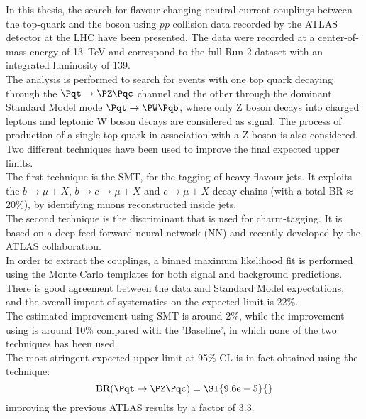 In this thesis, the search for flavour-changing neutral-current 
couplings between the top-quark and the \PZ boson using $pp$ collision 
data recorded by the ATLAS detector at the LHC have been presented.
The data were recorded at a center-of-mass energy of \SI{13}{\TeV} and correspond to the full Run-2 dataset with an integrated luminosity of \SI{139}{\ifb}. \\
The analysis is performed to search for \ttbar events with one top quark decaying through the $\Pqt\rightarrow\PZ\Pqc$ channel and the other through the dominant Standard Model mode $\Pqt\rightarrow\PW\Pqb$, where only Z boson decays into charged leptons and leptonic W boson decays are considered as signal.
The process of production of a single top-quark in association with a Z boson is also considered.\\
Two different techniques have been used to improve the final expected upper limits.
\vspace{\baselineskip}
\\The first technique is the SMT, for the tagging of heavy-flavour jets. It exploits the $b \rightarrow \mu + X$, $b \rightarrow c \rightarrow \mu + X$ and $c \rightarrow \mu + X$ decay chains (with a total BR$\approx$ 20\%), by identifying muons reconstructed inside jets. 
\vspace{\baselineskip}
\\The second technique is the \DLrc discriminant that is used for charm-tagging. It is based on a deep feed-forward neural network (NN) and recently developed by the ATLAS collaboration.
\vspace{\baselineskip}
\\In order to extract the \tZc couplings, a binned maximum likelihood fit is performed using the Monte Carlo templates for both signal and background predictions.
There is good agreement between the data and Standard
Model expectations, and the overall impact of systematics on the expected limit is 22\%.\\
The estimated improvement using SMT is around 2\%, while the improvement using \DLrc is around 10\% compared with the 'Baseline', in which none of the two techniques has been used.\\
The most stringent expected upper limit at 95\% CL is in fact obtained using the \DLrc technique:
\begin{equation*}
\mathrm{BR (\Pqt\rightarrow\PZ\Pqc)=\SI{9.6e-5}{}}
\end{equation*}
improving the previous ATLAS results by a factor of 3.3.
